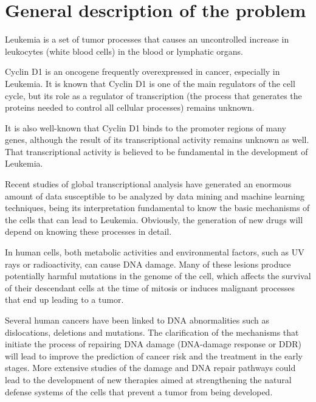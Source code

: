 
\section{General description of the problem}

Leukemia is a set of tumor processes that causes an uncontrolled increase in leukocytes (white blood cells) in the blood or lymphatic organs.

Cyclin D1 is an oncogene frequently overexpressed in cancer, especially in Leukemia.
It is known that Cyclin D1 is one of the main regulators of the cell cycle, but its role as a regulator of transcription (the process that generates the proteins needed to control all cellular processes) remains unknown.

It is also well-known that Cyclin D1 binds to the promoter regions of many genes, although the result of its transcriptional activity remains unknown as well. That transcriptional activity is believed to be fundamental in the development of Leukemia.

Recent studies of global transcriptional analysis have generated an enormous amount of data susceptible to be analyzed by data mining and machine learning techniques, being its interpretation fundamental to know the basic mechanisms of the cells that can lead to Leukemia.
Obviously, the generation of new drugs will depend on knowing these processes in detail.

In human cells, both metabolic activities and environmental factors, such as UV rays or radioactivity, can cause DNA damage. Many of these lesions produce potentially harmful mutations in the genome of the cell, which affects the survival of their descendant cells at the time of mitosis or induces malignant processes that end up leading to a tumor.

Several human cancers have been linked to DNA abnormalities such as dislocations, deletions and mutations. The clarification of the mechanisms that initiate the process of repairing DNA damage (DNA-damage response or DDR) will lead to improve the prediction of cancer risk and the treatment in the early stages. More extensive studies of the damage and DNA repair pathways could lead to the development of new therapies aimed at strengthening the natural defense systems of the cells that prevent a tumor from being developed.


